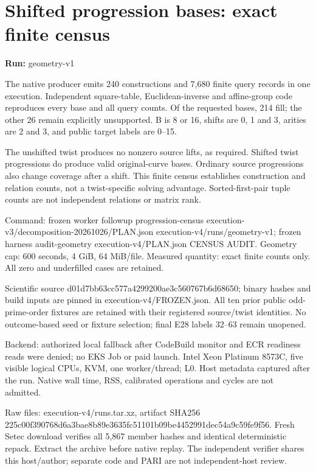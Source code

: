 \documentclass[10pt]{article}
\begin{document}
\section*{Shifted progression bases: exact finite census}
\textbf{Run:} geometry-v1\par
The native producer emits 240 constructions and 7,680 finite query records in one execution. Independent square-table, Euclidean-inverse and affine-group code reproduces every base and all query counts. Of the requested bases, 214 fill; the other 26 remain explicitly unsupported. B is 8 or 16, shifts are 0, 1 and 3, arities are 2 and 3, and public target labels are 0–15.

The unshifted twist produces no nonzero source lifts, as required. Shifted twist progressions do produce valid original-curve bases. Ordinary source progressions also change coverage after a shift. This finite census establishes construction and relation counts, not a twist-specific solving advantage. Sorted-first-pair tuple counts are not independent relations or matrix rank.

Command: frozen worker followup progression-census execution-v3/decomposition-20261026/PLAN.json execution-v4/runs/geometry-v1; frozen harness audit-geometry execution-v4/PLAN.json CENSUS AUDIT. Geometry cap: 600 seconds, 4 GiB, 64 MiB/file. Measured quantity: exact finite counts only. All zero and underfilled cases are retained.

Scientific source d01d7bb6\allowbreak{}3cc577a4\allowbreak{}299200ae\allowbreak{}3c560767\allowbreak{}b6d68650; binary hashes and build inputs are pinned in execution-v4/FROZEN.json. All ten prior public odd-prime-order fixtures are retained with their registered source/twist identities. No outcome-based seed or fixture selection; final E28 labels 32–63 remain unopened.

Backend: authorized local fallback after CodeBuild monitor and ECR readiness reads were denied; no EKS Job or paid launch. Intel Xeon Platinum 8573C, five visible logical CPUs, KVM, one worker/thread; L0. Host metadata captured after the run. Native wall time, RSS, calibrated operations and cycles are not admitted.

Raw files: execution-v4/runs.tar.xz, artifact SHA256 225c00f3\allowbreak{}90768d6a\allowbreak{}3bae8b89\allowbreak{}e3635fc5\allowbreak{}1101b09b\allowbreak{}e4452991\allowbreak{}dec54a9c\allowbreak{}59fe9f56. Fresh Setec download verifies all 5,867 member hashes and identical deterministic repack. Extract the archive before native replay. The independent verifier shares this host/author; separate code and PARI are not independent-host review.
\end{document}
